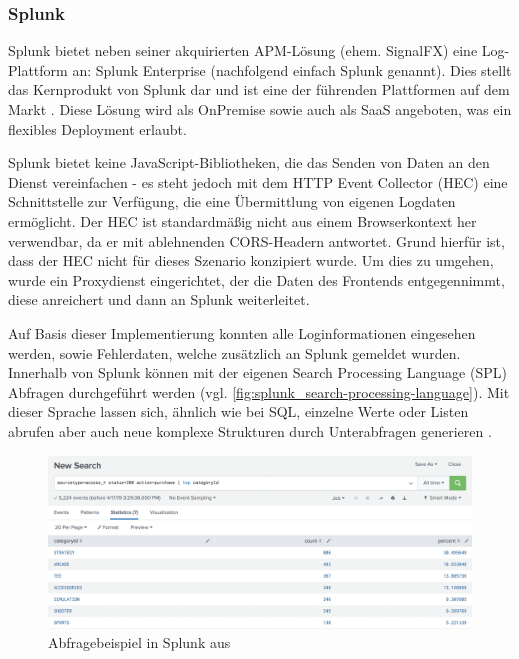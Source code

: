 \subsubsection{Splunk}
\label{subsec:splunk}

Splunk bietet neben seiner akquirierten APM-Lösung (ehem. SignalFX) eine Log-Plattform an: Splunk Enterprise (nachfolgend einfach Splunk genannt). Dies stellt das Kernprodukt von Splunk dar und ist eine der führenden Plattformen auf dem Markt \cite{ThreatIdentificationFromAccessLogsUsingElasticStack}. Diese Lösung wird als OnPremise sowie auch als SaaS angeboten, was ein flexibles Deployment erlaubt.

Splunk bietet keine JavaScript-Bibliotheken, die das Senden von Daten an den Dienst vereinfachen - es steht jedoch mit dem HTTP Event Collector (HEC) \cite{SplunkHEC} eine Schnittstelle zur Verfügung, die eine Übermittlung von eigenen Logdaten ermöglicht. Der HEC ist standardmäßig nicht aus einem Browserkontext her verwendbar, da er mit ablehnenden CORS-Headern antwortet. Grund hierfür ist, dass der HEC nicht für dieses Szenario konzipiert wurde. Um dies zu umgehen, wurde ein Proxydienst eingerichtet, der die Daten des Frontends entgegennimmt, diese anreichert und dann an Splunk weiterleitet.

Auf Basis dieser Implementierung konnten alle Loginformationen eingesehen werden, sowie Fehlerdaten, welche zusätzlich an Splunk gemeldet wurden. Innerhalb von Splunk können mit der eigenen Search Processing Language (SPL) \cite{SplunkSPL} Abfragen durchgeführt werden (vgl. \autoref{fig:splunk_search-processing-language}). Mit dieser Sprache lassen sich, ähnlich wie bei SQL, einzelne Werte oder Listen abrufen aber auch neue komplexe Strukturen durch Unterabfragen generieren \cite{SplunkSQLtoSPL}.

\begin{figure}[H]
	\centering
	\includegraphics[width=\linewidth]{img/03_methoden/splunk_search-processing-language.png}
	\caption{Abfragebeispiel in Splunk aus \cite{SplunkSPL}}
	\label{fig:splunk_search-processing-language}
\end{figure}

